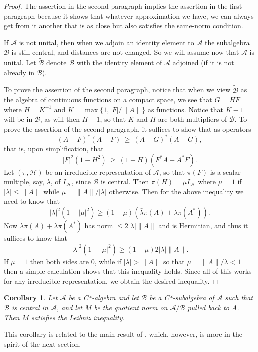 \documentclass[12pt]{amsart}
\newcommand{\<}{\langle}
\renewcommand{\>}{\rangle}
\renewcommand{\l}{\lambda}
\newcommand{\cA}{{\mathcal A}}
\newcommand{\cB}{{\mathcal B}}
\newcommand{\cH}{{\mathcal H}}
\newtheorem{corollary}[theorem]{Corollary}
\theoremstyle{definition}   %
\begin{document}
\begin{proof}
The assertion in the second paragraph implies the assertion in the first
paragraph because it shows that whatever approximation we have,
we can always get from it another that is as close but also
satisfies the same-norm condition. 

If $\cA$ is not unital, then when we adjoin an identity element to
$\cA$ the subalgebra $\cB$ is still central, and distances are
not changed. So we will assume now that
$\cA$ is unital. Let $\tilde \cB$ denote $\cB$ with the identity element 
of $\cA$ adjoined (if it is not already in $\cB$).

To prove the assertion of the
second paragraph, notice that 
when we view $\tilde \cB$ as the algebra of continuous functions
on a compact space, we see that $G = HF$ where $H = K^{-1}$
and $K = \max\{1, |F|/ \|A\|\}$ as functions. Notice that $K - 1$ will be in
$\cB$, as will then $H-1$, so that $K$ and $H$ are both multipliers
of $\cB$. To prove the assertion of the second paragraph,
it suffices to show that as operators
\[
(A-F)^*(A-F) \ \geq \ (A-G)^*(A-G)  ,
\]
that is, upon simplification, that 
\[
|F|^2(1-H^2) \ \geq \ (1-H)(F^*A + A^*F)  .
\]
Let $(\pi, \cH)$ be an irreducible representation of $\cA$, 
so that $\pi(F)$ is a scalar multiple, say, $\l$, of $I_\cH$, since $\cB$ is central. 
Then $\pi(H) = \mu I_\cH$ where $\mu = 1$ if $|\l| \leq \|A\|$ while 
$\mu = \|A\|/|\l|$ otherwise. Then for the above inequality we need to know that
\[
|\l|^2(1-|\mu|^2) \geq (1-\mu)(\bar \l \pi(A) + \l \pi(A^*)).
\]
Now $\bar \l \pi(A) + \l \pi(A^*)$ has norm $\leq 2|\l|\|A\|$ and is Hermitian,
and thus it suffices to know that
\[
|\l|^2(1-|\mu|^2) \geq (1-\mu)2|\l|\|A\|   .
\]
If $\mu = 1$ then both sides are 0, while if $|\l| > \|A\|$ so that 
$\mu = \|A\|/\l < 1$ then a simple calculation shows that this inequality
holds. Since all of this works for any irreducible representation, we
obtain the desired inequality.
\end{proof}

\begin{corollary}
\label{central}
Let $\cA$ be a C*-algebra and let $\cB$ be a C*-subalgebra
of $\cA$ such that $\cB$ is \emph{central} in $\cA$, and let 
$M$ be the quotient norm on $\cA/\cB$ pulled back to $A$. 
Then $M$ satisfies the Leibniz inequality.
\end{corollary}

This corollary is related to the main result of \cite{Gjn}, which, however,
is more in the spirit of the next section.
\end{document}
